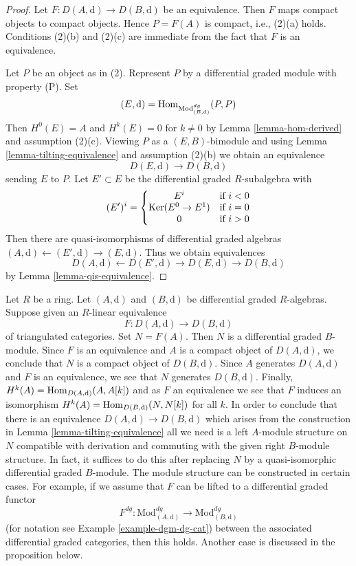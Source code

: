 \begin{proof}
Let $F : D(A, \text{d}) \to D(B, \text{d})$ be an equivalence.
Then $F$ maps compact objects to compact objects. Hence $P = F(A)$ is
compact, i.e., (2)(a) holds. Conditions (2)(b) and (2)(c) are immediate
from the fact that $F$ is an equivalence.

\medskip\noindent
Let $P$ be an object as in (2). Represent $P$ by a
differential graded module with property (P). Set
$$
(E, \text{d}) = \mathop{\mathrm{Hom}}\nolimits_{\text{Mod}^{dg}_{(B, \text{d})}}(P, P)
$$
Then $H^0(E) = A$ and $H^k(E) = 0$ for $k \not = 0$ by
Lemma \ref{lemma-hom-derived} and assumption (2)(c).
Viewing $P$ as a $(E, B)$-bimodule and using
Lemma \ref{lemma-tilting-equivalence} and assumption (2)(b)
we obtain an equivalence
$$
D(E, \text{d}) \to D(B, \text{d})
$$
sending $E$ to $P$.
Let $E' \subset E$ be the differential graded $R$-subalgebra
with
$$
(E')^i = \left\{
\begin{matrix}
E^i & \text{if }i < 0 \\
\mathop{\mathrm{Ker}}(E^0 \to E^1) & \text{if }i = 0 \\
0 & \text{if }i > 0
\end{matrix}
\right.
$$
Then there are quasi-isomorphisms of differential graded
algebras $(A, \text{d}) \leftarrow (E', \text{d}) \rightarrow (E, \text{d})$.
Thus we obtain equivalences
$$
D(A, \text{d}) \leftarrow D(E', \text{d}) \rightarrow D(E, \text{d})
\rightarrow D(B, \text{d})
$$
by Lemma \ref{lemma-qis-equivalence}.
\end{proof}

\begin{remark}
\label{remark-lift-equivalence-to-dga}
Let $R$ be a ring. Let $(A, \text{d})$ and $(B, \text{d})$ be differential
graded $R$-algebras. Suppose given an $R$-linear equivalence
$$
F : D(A, \text{d}) \longrightarrow D(B, \text{d})
$$
of triangulated categories. Set $N = F(A)$. Then $N$ is a differential
graded $B$-module. Since $F$ is an equivalence and $A$ is a compact
object of $D(A, \text{d})$, we conclude that $N$ is a compact object
of $D(B, \text{d})$. Since $A$ generates $D(A, \text{d})$ and
$F$ is an equivalence, we see that $N$ generates $D(B, \text{d})$.
Finally, $H^k(A) = \mathop{\mathrm{Hom}}\nolimits_{D(A, \text{d})}(A, A[k])$ and as $F$ an equivalence
we see that $F$ induces an isomorphism
$H^k(A) = \mathop{\mathrm{Hom}}\nolimits_{D(B, \text{d})}(N, N[k])$ for all $k$.
In order to conclude that there is an equivalence
$D(A, \text{d}) \longrightarrow D(B, \text{d})$ which
arises from the construction in
Lemma \ref{lemma-tilting-equivalence}
all we need is a left $A$-module structure on $N$
compatible with derivation and commuting
with the given right $B$-module structure. In fact, it
suffices to do this after replacing $N$ by a quasi-isomorphic
differential graded $B$-module.
The module structure can be constructed in certain cases.
For example, if we assume that $F$ can be lifted to a
differential graded functor
$$
F^{dg} :
\text{Mod}^{dg}_{(A, \text{d})}
\longrightarrow
\text{Mod}^{dg}_{(B, \text{d})}
$$
(for notation see Example \ref{example-dgm-dg-cat})
between the associated differential graded categories,
then this holds. Another case is discussed in the proposition below.
\end{remark}

